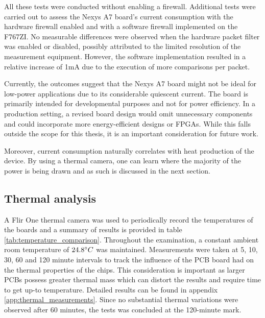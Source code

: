 All these tests were conducted without enabling a firewall. Additional tests were carried out to assess the Nexys A7 board's current consumption with the hardware firewall enabled and with a software firewall implemented on the F767ZI. No measurable differences were observed when the hardware packet filter was enabled or disabled, possibly attributed to the limited resolution of the measurement equipment. However, the software implementation resulted in a relative increase of 1mA due to the execution of more comparisons per packet.

Currently, the outcomes suggest that the Nexys A7 board might not be ideal for low-power applications due to its considerable quiescent current. The board is primarily intended for developmental purposes and not for power efficiency. In a production setting, a revised board design would omit unnecessary components and could incorporate more energy-efficient designs or FPGAs. While this falls outside the scope for this thesis, it is an important consideration for future work.

Moreover, current consumption naturally correlates with heat production of the device. By using a thermal camera, one can learn where the majority of the power is being drawn and as such is discussed in the next section.









\subsection{Thermal analysis}

A Flir One thermal camera was used to periodically record the temperatures of the boards and a summary of results is provided in table \ref{tab:temperature_comparison}. Throughout the examination, a constant ambient room temperature of $24.8\degree C$ was maintained. Measurements were taken at 5, 10, 30, 60 and 120 minute intervals to track the influence of the PCB board had on the thermal properties of the chips. This consideration is important as larger PCBs possess greater thermal mass which can distort the results and require time to get up-to temperature. Detailed results can be found in appendix \ref{app:thermal_measurements}. Since no substantial thermal variations were observed after 60 minutes, the tests was concluded at the 120-minute mark.


